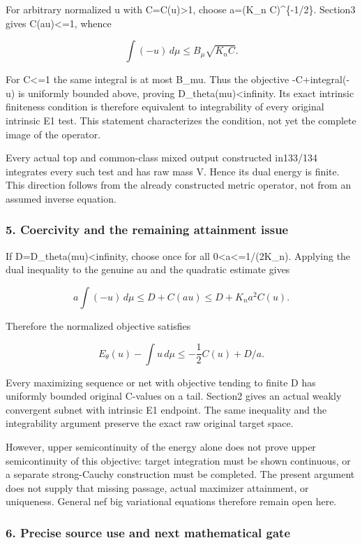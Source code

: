 \documentclass[
]{article}
\begin{document}
For arbitrary normalized u with C=C(u)\textgreater1, choose a=(K\_n
C)\^{}\{-1/2\}. Section3 gives C(au)\textless=1, whence

\[\int(-u)\,d\mu\le B_\mu\sqrt{K_n C}.\]

For C\textless=1 the same integral is at most B\_mu. Thus the objective
-C+integral(-u) is uniformly bounded above, proving
D\_theta(mu)\textless infinity. Its exact intrinsic finiteness condition
is therefore equivalent to integrability of every original intrinsic E1
test. This statement characterizes the condition, not yet the complete
image of the operator.

Every actual top and common-class mixed output constructed in133/134
integrates every such test and has raw mass V. Hence its dual energy is
finite. This direction follows from the already constructed metric
operator, not from an assumed inverse equation.

\subsubsection{5. Coercivity and the remaining attainment
issue}\label{coercivity-and-the-remaining-attainment-issue}

If D=D\_theta(mu)\textless infinity, choose once for all
0\textless a\textless=1/(2K\_n). Applying the dual inequality to the
genuine au and the quadratic estimate gives

\[a\int(-u)\,d\mu\le D+C(au)
\le D+K_n a^2 C(u).\]

Therefore the normalized objective satisfies

\[E_\theta(u)-\int u\,d\mu
\le-\frac12 C(u)+D/a.\]

Every maximizing sequence or net with objective tending to finite D has
uniformly bounded original C-values on a tail. Section2 gives an actual
weakly convergent subnet with intrinsic E1 endpoint. The same inequality
and the integrability argument preserve the exact raw original target
space.

However, upper semicontinuity of the energy alone does not prove upper
semicontinuity of this objective: target integration must be shown
continuous, or a separate strong-Cauchy construction must be completed.
The present argument does not supply that missing passage, actual
maximizer attainment, or uniqueness. General nef big variational
equations therefore remain open here.

\subsubsection{6. Precise source use and next mathematical
gate}\label{precise-source-use-and-next-mathematical-gate}
\end{document}
